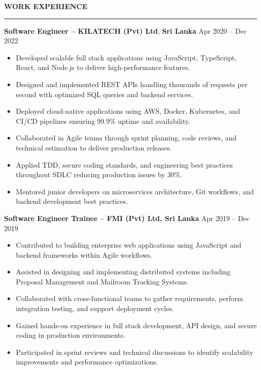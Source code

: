 \documentclass[10pt,letterpaper]{article}
\begin{document}
\vspace{8pt}

\textbf{WORK EXPERIENCE}\\[-8pt]
\noindent\rule{\textwidth}{1pt}

\vspace{-2pt}

\textbf{Software Engineer -- KILATECH (Pvt) Ltd}, \textbf{Sri Lanka} \hfill Apr 2020 -- Dec 2022

\vspace{-1pt}

\begin{itemize}
\item Developed scalable full stack applications using JavaScript, TypeScript, React, and Node.js to deliver high-performance features.
\item Designed and implemented REST APIs handling thousands of requests per second with optimized SQL queries and backend services.
\item Deployed cloud-native applications using AWS, Docker, Kubernetes, and CI/CD pipelines ensuring 99.9\% uptime and availability.
\item Collaborated in Agile teams through sprint planning, code reviews, and technical estimation to deliver production releases.
\item Applied TDD, secure coding standards, and engineering best practices throughout SDLC reducing production issues by 30\%.
\item Mentored junior developers on microservices architecture, Git workflows, and backend development best practices.
\end{itemize}

\textbf{Software Engineer Trainee -- FMI (Pvt) Ltd, Sri Lanka} \hfill Apr 2019 -- Dec 2019

\vspace{-1pt}

\begin{itemize}
\item Contributed to building enterprise web applications using JavaScript and backend frameworks within Agile workflows.
\item Assisted in designing and implementing distributed systems including Proposal Management and Mailroom Tracking Systems.
\item Collaborated with cross-functional teams to gather requirements, perform integration testing, and support deployment cycles.
\item Gained hands-on experience in full stack development, API design, and secure coding in production environments.
\item Participated in sprint reviews and technical discussions to identify scalability improvements and performance optimizations.
\end{itemize}
\end{document}
